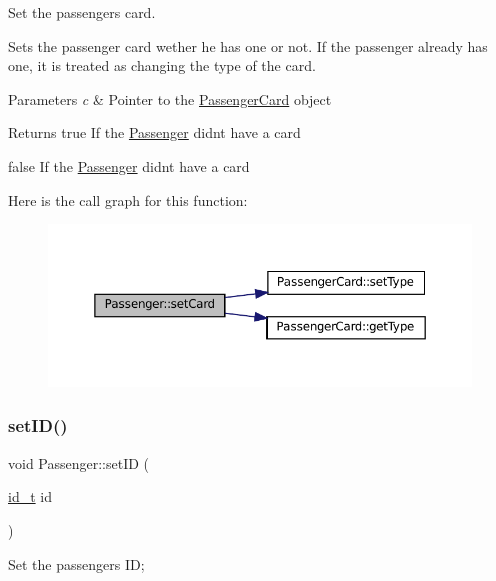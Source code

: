 Set the passenger\textquotesingle{}s card. 

Sets the passenger card wether he has one or not. If the passenger already has one, it is treated as changing the type of the card.


\begin{DoxyParams}{Parameters}
{\em c} & Pointer to the \mbox{\hyperlink{classPassengerCard}{Passenger\+Card}} object \\
\hline
\end{DoxyParams}
\begin{DoxyReturn}{Returns}
true If the \mbox{\hyperlink{classPassenger}{Passenger}} didn\textquotesingle{}t have a card 

false If the \mbox{\hyperlink{classPassenger}{Passenger}} didn\textquotesingle{}t have a card 
\end{DoxyReturn}
Here is the call graph for this function\+:
\nopagebreak
\begin{figure}[H]
\begin{center}
\leavevmode
\includegraphics[width=350pt]{classPassenger_a09fa79cfc599fa16f54fc34db0b56ea4_cgraph}
\end{center}
\end{figure}
\mbox{\label{classPassenger_a13b831d7ccd52a81ee4f5d47bcd2c795}} 
\subsubsection{\texorpdfstring{set\+I\+D()}{setID()}}
{\footnotesize\ttfamily void Passenger\+::set\+ID (\begin{DoxyParamCaption}\item[{\mbox{\hyperlink{project__utils_8h_a8f3a969054ad2200720b96e7e23dd4e1}{id\+\_\+t}}}]{id }\end{DoxyParamCaption})}

Set the passenger\textquotesingle{}s ID; 

